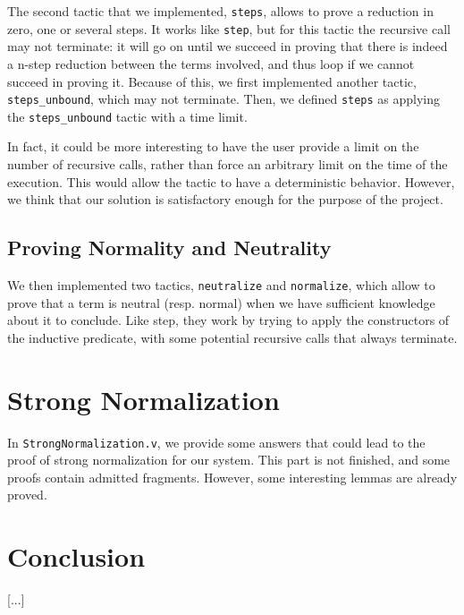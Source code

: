 \documentclass[a4paper,11pt]{article}
\begin{document}
The second tactic that we implemented, \verb|steps|, allows to prove
a reduction in zero, one or several steps. It works like \verb|step|,
but for this tactic the recursive call may not terminate: it will
go on until we succeed in proving that there is indeed a n-step
reduction between the terms involved, and thus loop if we cannot
succeed in proving it. Because of this, we first implemented another
tactic, \verb|steps_unbound|, which may not terminate. Then, we
defined \verb|steps| as applying the \verb|steps_unbound| tactic with
a time limit.

In fact, it could be more interesting to have the user provide a limit
on the number of recursive calls, rather than force an arbitrary limit
on the time of the execution. This would allow the tactic to have a
deterministic behavior. However, we think that our solution is
satisfactory enough for the purpose of the project.

\subsection{Proving Normality and Neutrality}

We then implemented two tactics, \verb|neutralize| and
\verb|normalize|, which allow to prove that a term is neutral
(resp. normal) when we have sufficient knowledge about it to conclude.
Like step, they work by trying to apply the constructors of the
inductive predicate, with some potential recursive calls that always
terminate.

\section{Strong Normalization}

In \verb|StrongNormalization.v|, we provide some answers that could
lead to the proof of strong normalization for our system. This part is
not finished, and some proofs contain admitted fragments. However,
some interesting lemmas are already proved.

\section*{Conclusion}

[...]
\end{document}
